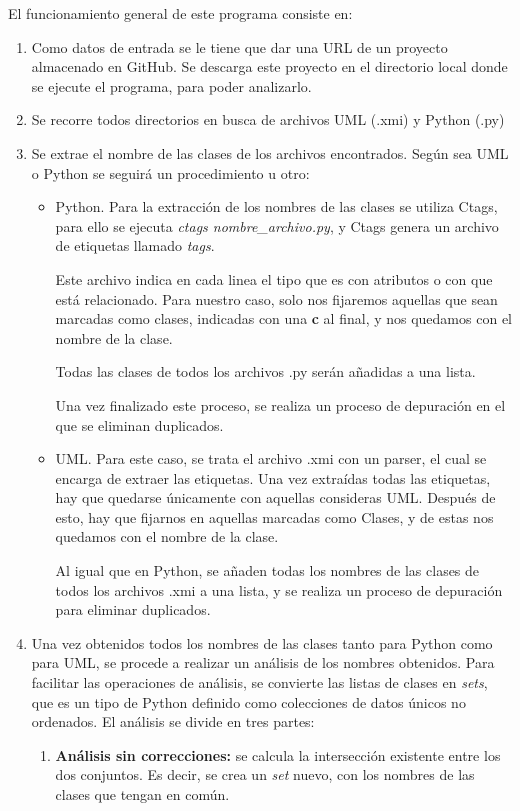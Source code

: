 \documentclass[a4paper, 12pt]{book}
\begin{document}
El funcionamiento general de este programa consiste en:
\begin{enumerate}
  \item Como datos de entrada se le tiene que dar una URL de un proyecto almacenado en GitHub. Se descarga
  este proyecto en el directorio local donde se ejecute el programa, para poder analizarlo.
  \item Se recorre todos directorios en busca de archivos UML (.xmi) y Python (.py)
  \item Se extrae el nombre de las clases de los archivos encontrados. Según sea UML o Python se seguirá
  un procedimiento u otro:
  \begin{itemize}
    \item Python. Para la extracción de los nombres de las clases se utiliza Ctags, para ello se ejecuta
    \textit{ctags nombre\_archivo.py}, y Ctags genera un archivo de etiquetas llamado \textit{tags}.

    Este archivo indica en cada linea el tipo que es con atributos o con que está relacionado. Para nuestro
    caso, solo nos fijaremos aquellas que sean marcadas como clases, indicadas con
    una \textbf{c} al final, y nos quedamos con el nombre de la clase.

    Todas las clases de todos los archivos .py serán añadidas a una lista.

    Una vez finalizado este proceso,
    se realiza un proceso de depuración en el que se eliminan duplicados.
    \item UML. Para este caso, se trata el archivo .xmi con un parser, el cual se encarga de extraer las etiquetas. Una vez
    extraídas todas las etiquetas, hay que quedarse únicamente con aquellas consideras UML. Después de esto,
    hay que fijarnos en aquellas marcadas como Clases, y de estas nos quedamos con el nombre de la clase.

    Al igual que en Python, se añaden todas los nombres de las clases de todos los archivos .xmi a una lista, y se
    realiza un proceso de depuración para eliminar duplicados.
  \end{itemize}
  \item Una vez obtenidos todos los nombres de las clases tanto para Python como para UML, se procede a realizar
  un análisis de los nombres obtenidos. Para facilitar las operaciones de análisis, se convierte las listas de clases en \textit{sets},
  que es un tipo de Python definido como colecciones de datos únicos no ordenados. El análisis se divide en tres partes:
  \begin{enumerate}
    \item \textbf{Análisis sin correcciones:} se calcula la intersección existente entre los dos conjuntos. Es decir,
    se crea un \emph{set} nuevo, con los nombres de las clases que tengan en común.


\end{enumerate}
\end{enumerate}
\end{document}
